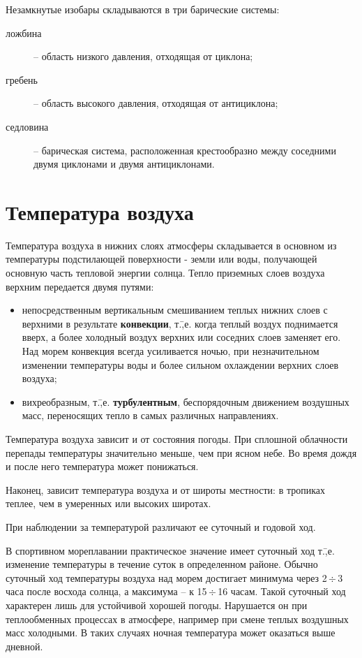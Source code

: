 \documentclass[a4paper, 12pt, twoside, final, book, russian, fittopage, cyremdash]{ncc}
\newcommand{\otdo}{\,\ensuremath{\div}\,}
\begin{document}
Незамкнутые изобары складываются в три барические системы:

\begin{description}
\item[ложбина] \--- область низкого давления, отходящая от циклона; 
\item[гребень] \--- область высокого давления, отходящая от антициклона; 
\item[седловина] \--- барическая система, расположенная крестообразно между соседними двумя циклонами и двумя антициклонами.
\end{description}

\section{Температура воздуха}

Температура воздуха в нижних слоях атмосферы складывается в основном из температуры подстилающей поверхности - земли или воды, получающей основную часть тепловой энергии солнца. Тепло приземных слоев воздуха верхним передается двумя путями:

\begin{itemize}
\item непосредственным вертикальным смешиванием теплых нижних слоев с верхними в результате \textbf{конвекции}, т.\=,е. когда теплый воздух поднимается вверх, а более холодный воздух верхних или соседних слоев заменяет его. Над морем конвекция всегда усиливается ночью, при незначительном изменении температуры воды и более сильном охлаждении верхних слоев воздуха; 
\item вихреобразным, т.\=,е. \textbf{турбулентным}, беспорядочным движением воздушных масс, переносящих тепло в самых различных направлениях. 
\end{itemize}

Температура воздуха зависит и от состояния погоды. При сплошной облачности перепады температуры значительно меньше, чем при ясном небе. Во время дождя и после него температура может понижаться.

Наконец, зависит температура воздуха и от широты местности: в тропиках теплее, чем в умеренных или высоких широтах.

При наблюдении за температурой различают ее суточный и годовой ход.

В спортивном мореплавании практическое значение имеет суточный ход т.\=,е. изменение температуры в течение суток в определенном районе. Обычно суточный ход температуры воздуха над морем достигает минимума через 2\otdo 3 часа после восхода солнца, а максимума \--- к 15\otdo 16 часам. Такой суточный ход характерен лишь для устойчивой хорошей погоды. Нарушается он при теплообменных процессах в атмосфере, например при смене теплых воздушных масс холодными. В таких случаях ночная температура может оказаться выше дневной.
\end{document}
